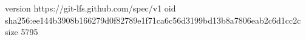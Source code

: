 version https://git-lfs.github.com/spec/v1
oid sha256:ee144b3908b166279d0f82789e1f71ca6c56d3199bd13b8a7806eab2c6d1cc2c
size 5795
